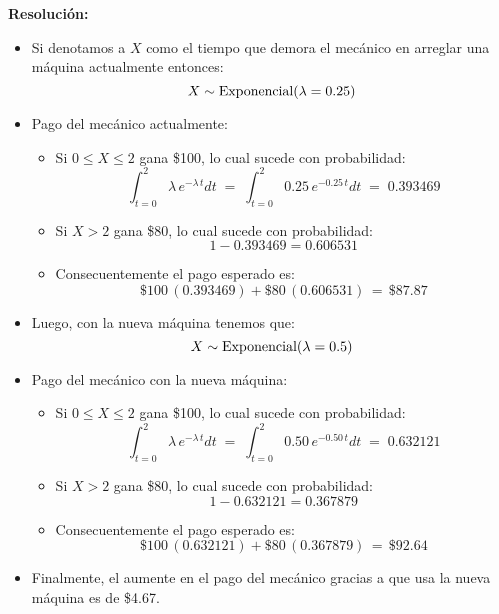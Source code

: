\documentclass[ 10pt, xcolor = dvipsnames]{beamer}
\begin{document}
\begin{frame}[allowframebreaks]
\frametitle{\insertsection}

\textbf{Resoluci\'on:}
\begin{itemize}
\item Si denotamos a $X$ como el tiempo que demora el mec\'anico en arreglar una m\'aquina actualmente entonces: 
\[
X \sim \text{Exponencial}( \lambda = 0.25 )
\]
\item Pago del mec\'anico actualmente:
\begin{itemize}
\item Si $0 \leq X \leq 2$ gana \$100, lo cual sucede con probabilidad: 
\[
\int_{t=0}^2 \lambda \, e^{ -\lambda \, t } dt \; = \;
\int_{t=0}^2 0.25 \, e^{ -0.25 \, t } dt \; = \; 0.393469
\]
\item Si $X > 2$ gana \$80, lo cual sucede con probabilidad:
\[
1 - 0.393469 = 0.606531
\]
\framebreak
\item Consecuentemente el pago esperado es: 
\[
\$100 \, (0.393469) + \$80 \, (0.606531) \, = \, \$87.87
\]
\end{itemize}
\item Luego, con la nueva m\'aquina tenemos que: 
\[
X \sim \text{Exponencial}( \lambda = 0.5 )
\]
\item Pago del mec\'anico con la nueva  m\'aquina: 
\begin{itemize}
\item Si $0 \leq X \leq 2$ gana \$100, lo cual sucede con probabilidad: 
\[
\int_{t=0}^2 \lambda \, e^{ -\lambda \, t } dt \; = \;
\int_{t=0}^2 0.50 \, e^{ -0.50 \, t } dt \; = \; 0.632121
\]
\framebreak
\item Si $X > 2$ gana \$80, lo cual sucede con probabilidad:
\[
1 - 0.632121 = 0.367879
\]
\item Consecuentemente el pago esperado es: 
\[
\$100 \, (0.632121) + \$80 \, (0.367879) \, = \, \$92.64
\]
\end{itemize}
\item Finalmente, el aumente en el pago del mec\'anico gracias a que usa la nueva m\'aquina es de \$4.67. 
\end{itemize}

\end{frame}
\end{document}
